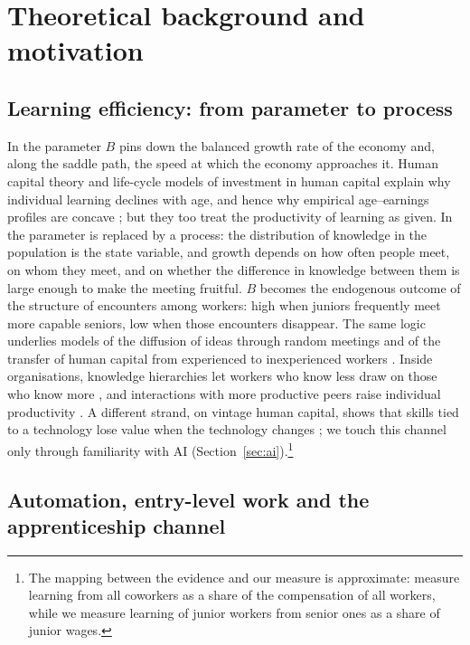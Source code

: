 \documentclass[preprint,12pt,authoryear]{elsarticle}
\begin{document}
\section{Theoretical background and motivation}\label{sec:background}

\subsection{Learning efficiency: from parameter to process}

In \citet{Lucas1988} the parameter $B$ pins down the balanced growth rate of the economy and, along the saddle path, the speed at which the economy approaches it. Human capital theory \citep{Becker1964,Mincer1974} and life-cycle models of investment in human capital \citep{BenPorath1967,Rosen1972} explain why individual learning declines with age, and hence why empirical age--earnings profiles are concave \citep{MurphyWelch1990,Lagakos2018}; but they too treat the productivity of learning as given. In \citet{LucasMoll2014} the parameter is replaced by a process: the distribution of knowledge in the population is the state variable, and growth depends on how often people meet, on whom they meet, and on whether the difference in knowledge between them is large enough to make the meeting fruitful. $B$ becomes the endogenous outcome of the structure of encounters among workers: high when juniors frequently meet more capable seniors, low when those encounters disappear. The same logic underlies models of the diffusion of ideas through random meetings \citep{AlvarezBueraLucas2013,PerlaTonetti2014,BueraOberfield2020} and of the transfer of human capital from experienced to inexperienced workers \citep{JovanovicNyarko1995}. Inside organisations, knowledge hierarchies let workers who know less draw on those who know more \citep{Garicano2000,GaricanoRossiHansberg2006}, and interactions with more productive peers raise individual productivity \citep{Akcigit2018}. A different strand, on vintage human capital, shows that skills tied to a technology lose value when the technology changes \citep{ChariHopenhayn1991,Violante2002}; we touch this channel only through familiarity with AI (Section~\ref{sec:ai}).\footnote{The mapping between the evidence and our measure is approximate: \citet{Jarosch2021} measure learning from all coworkers as a share of the compensation of all workers, while we measure learning of junior workers from senior ones as a share of junior wages.}

\subsection{Automation, entry-level work and the apprenticeship channel}
\end{document}
